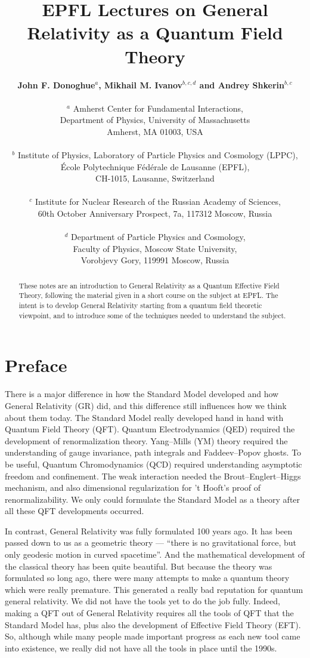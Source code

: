 \documentclass[11pt,a4paper]{article}
\date{}
\title{{\bf EPFL Lectures on General Relativity as a Quantum Field Theory  }}
\author{{\bf John F. Donoghue$^{a}$,
Mikhail M. Ivanov$^{b,c,d}$
and Andrey Shkerin$^{b,c}$} \\ \\
$^a$ Amherst Center for Fundamental Interactions, \\Department of Physics,
University of Massachusetts\\
Amherst, MA  01003, USA\\  \\
$^b$ Institute of Physics, Laboratory of Particle Physics and Cosmology (LPPC), \\
\'Ecole Polytechnique F\'ed\'erale de Lausanne (EPFL), \\
CH-1015, Lausanne, Switzerland \\ \\
$^c$ Institute for Nuclear Research of the
Russian Academy of Sciences,\\
60th October Anniversary Prospect, 7a, 117312
Moscow, Russia \\ \\
$^d$ Department of Particle Physics and Cosmology, \\
Faculty of Physics, Moscow State University,\\
Vorobjevy Gory, 119991 Moscow, Russia}
\begin{document}
\maketitle

\begin{abstract}
These notes are an introduction to General Relativity as a Quantum Effective Field Theory, following the material given in a short course on the subject at EPFL. The intent is to develop General Relativity starting from a quantum field theoretic viewpoint, and to introduce some of the techniques needed to understand the subject.
\end{abstract}

\newpage

\tableofcontents

\newpage

\section*{Preface}

There is a major difference in how the Standard Model developed and how General Relativity (GR) did, and this difference still influences how we think about them today.
The Standard Model really developed hand in hand with Quantum Field Theory (QFT). Quantum Electrodynamics (QED) required the development of renormalization theory. Yang--Mills (YM) theory required the understanding of gauge invariance, path integrals and Faddeev--Popov ghosts. To be useful, Quantum Chromodynamics (QCD) required understanding asymptotic freedom and confinement. The weak interaction needed the Brout--Englert--Higgs mechanism, and also dimensional regularization for 't Hooft's proof of renormalizability. We only could formulate the Standard Model as a theory after all these QFT developments occurred.

In contrast, General Relativity was fully formulated 100 years ago. It has been passed down to us as a geometric theory --- ``there is no gravitational force, but only geodesic motion in curved spacetime''. And the mathematical development of the classical theory has been quite beautiful. But because the theory was formulated so long ago, there were many attempts to make a quantum theory which were really premature. This generated a really bad reputation for quantum general relativity. We did not have the tools yet to do the job fully. Indeed, making a QFT out of General Relativity requires all the tools of QFT that the Standard Model has, plus also the development of Effective Field Theory (EFT). So, although while many people made important progress as each new tool came into existence, we really did not have all the tools in place until the 1990s.
\end{document}
